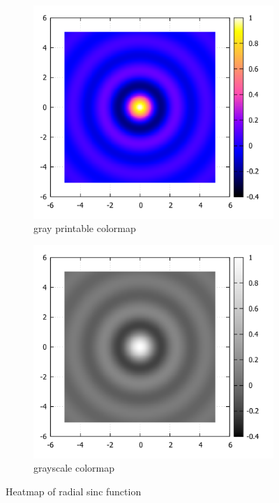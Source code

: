 \documentclass[11pt]{article}
\begin{document}
\begin{figure}[h!]
 \centering
 \begin{subfigure}[b]{0.45\textwidth}
  \includegraphics[width=\textwidth]{Plots/SincHeatmapPrintableColors.pdf}
  \caption{gray printable colormap}
	\label{fig:SincHeatmapPrintableColors}
 \end{subfigure}
 \begin{subfigure}[b]{0.45\textwidth}
  \includegraphics[width=\textwidth]{Plots/SincHeatmapGrayscale.pdf}
  \caption{grayscale colormap}
  \label{fig:SincHeatmapGrayscale}
 \end{subfigure}
 \caption{Heatmap of radial sinc function}
 \label{fig:SincHeatmap}
\end{figure}
\end{document}
